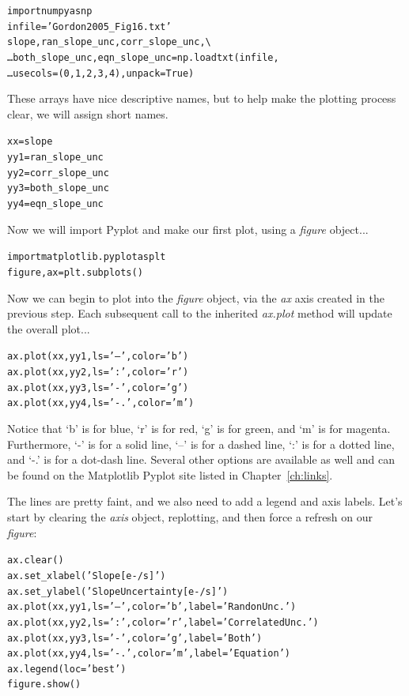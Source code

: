 \begin{alltt}
\pytab import numpy as np 
\pytab infile = 'Gordon2005_Fig16.txt' 
\pytab slope, ran_slope_unc, corr_slope_unc, \textbackslash 
\ldots      both_slope_unc, eqn_slope_unc = np.loadtxt(infile, 
\ldots      usecols=(0, 1, 2, 3, 4), unpack=True) 
\end{alltt}

These arrays have nice descriptive names, but to help make the
plotting process clear, we will assign short names.

\begin{alltt}
\pytab xx = slope  
\pytab yy1 = ran_slope_unc  
\pytab yy2 = corr_slope_unc  
\pytab yy3 = both_slope_unc
\pytab yy4 = eqn_slope_unc 
\end{alltt}

Now we will import Pyplot and make our first plot, using a \textit{figure} 
object...

\begin{alltt}
\pytab import matplotlib.pyplot as plt  
\pytab figure, ax = plt.subplots()
\end{alltt}

Now we can begin to plot into the \textit{figure} object, via the \textit{ax} 
axis created in the previous step. Each subsequent call to the inherited 
\textit{ax.plot} method will update the overall plot... 

\begin{alltt}
\pytab ax.plot(xx, yy1, ls='--', color='b')
\pytab ax.plot(xx, yy2, ls=':', color='r')
\pytab ax.plot(xx, yy3, ls='-', color='g')
\pytab ax.plot(xx, yy4, ls='-.', color='m')
\end{alltt}

Notice that `b' is for blue, `r' is for red, `g' is for green, and `m'
is for magenta.  Furthermore, `-' is for a solid line, `--' is for a
dashed line, `:' is for a dotted line, and `-.' is for a dot-dash
line.  Several other options are available as well and can be found on
the Matplotlib Pyplot site listed in Chapter~\ref{ch:links}. 

The lines are pretty faint, and we also need to add a legend and axis
labels. Let's start by clearing the \textit{axis} object, replotting, and then 
force a refresh on our \textit{figure}:

\begin{alltt}
\pytab ax.clear()
\pytab ax.set_xlabel('Slope [e-/s]')
\pytab ax.set_ylabel('Slope Uncertainty [e-/s]')
\pytab ax.plot(xx, yy1, ls='--', color='b', label='Randon Unc.')
\pytab ax.plot(xx, yy2, ls=':', color='r', label='Correlated Unc.')
\pytab ax.plot(xx, yy3, ls='-', color='g', label='Both')
\pytab ax.plot(xx, yy4, ls='-.', color='m', label='Equation')
\pytab ax.legend(loc='best')
\pytab figure.show()
\end{alltt}

